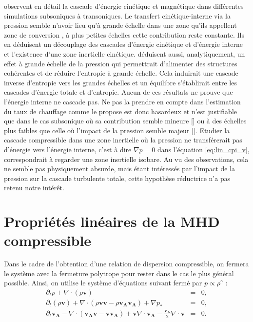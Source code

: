 \cite{aluie_conservative_2012} observent en détail la cascade d'énergie cinétique et magnétique dans différentes simulations subsoniques à transoniques. Le transfert cinétique-interne via la pression semble n'avoir lieu qu'à grande échelle dans une zone qu'ils appellent \og zone de conversion \fg{}, à plus petites échelles cette contribution reste constante. Ils en déduisent un découplage des cascades d'énergie cinétique et d'énergie interne et l'existence d'une zone inertielle cinétique. \cite{eyink_cascades_2018} déduisent aussi, analytiquement, un effet à grande échelle de la pression qui permettrait d'alimenter des structures cohérentes et de réduire l'entropie à grande échelle. Cela induirait une cascade inverse d'entropie vers les grandes échelles et un équilibre s'établirait entre les cascades d'énergie totale et d'entropie. Aucun de ces résultats ne prouve que l'énergie interne ne cascade pas. Ne pas la prendre en compte dans l'estimation du taux de chauffage comme le propose \cite{hellinger_von_2018} est donc hasardeux et n'est justifiable que dans le cas subsonique où sa contribution semble mineure [\cite{andres_energy_2018,ferrand_compressible_2020}] ou à des échelles plus faibles que celle où l'impact de la pression semble majeur [\cite{aluie_conservative_2012}]. Etudier la cascade compressible dans une zone inertielle où la pression ne transférerait pas d'énergie vers l'énergie interne, c'est à dire $\nabla p = 0$ dans l'équation \eqref{eq:lin_cpi_v}, correspondrait à regarder une zone inertielle isobare. Au vu des observations, cela ne semble pas physiquement absurde, mais étant intéressés par l'impact de la pression sur la cascade turbulente totale, cette hypothèse réductrice n'a pas retenu notre intérêt. 


\section{Propriétés linéaires de la MHD compressible}
\label{sec-123}

Dans le cadre de l'obtention d'une relation de dispersion compressible, on fermera le système avec la fermeture polytrope pour rester dans le cas le plus général possible. Ainsi, on utilise le système d'équations suivant fermé par $p\propto \rho^{\gamma}$ : 
\begin{eqnarray}
\label{eq:lin_cpi_r}\partial_t \rho + \nabla \cdot \left(\rho \boldsymbol{v}\right) &=& 0,\\
\label{eq:lin_cpi_v}\partial_t \left(\rho \boldsymbol{v}\right) + \nabla \cdot \left(\rho \boldsymbol{v}\boldsymbol{v} - \rho \boldsymbol{v_A}\boldsymbol{v_A}\right) +  \nabla p_*  &=& 0 \label{eq:model_1}, \\
\label{eq:lin_cpi_b}\partial_t \boldsymbol{v_A} -  \nabla \cdot \left(\boldsymbol{v_A}\boldsymbol{v} - \boldsymbol{v}\boldsymbol{v_A}\right) +  \boldsymbol{v}  \nabla \cdot \boldsymbol{v_A} -  \frac{\boldsymbol{v_A}}{2}  \nabla \cdot \boldsymbol{v} &=& 0 .
\end{eqnarray}
 
